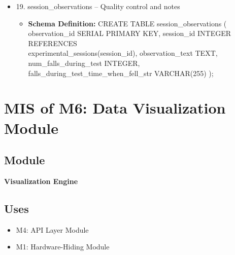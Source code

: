\documentclass[12pt, titlepage]{article}
\begin{document}
\begin{itemize}
\begin{itemize}
	\item{\textbf{Schema Definition: }CREATE TABLE session\_data\_files (
	      data\_file\_id SERIAL PRIMARY KEY,
	      session\_id INTEGER REFERENCES experimental\_sessions(session\_id),
	      movie\_file\_id INTEGER REFERENCES movie\_files(movie\_file\_id),
	      start\_frame INTEGER,
	      object\_type\_id INTEGER REFERENCES lkp\_data\_file\_object\_type(object\_type\_id),
	      file\_extension VARCHAR(10),
	      file\_name VARCHAR(255),
	      file\_size\_mb DOUBLE PRECISION,
	      notes\_session\_data\_files TEXT
	      );
	      }
	\item{\textbf{Referenced By: }data\_file\_locations \textbf{Foreign Key: }..data\_file\_id (One-to-Many. Each file record has multiple location records (local, FRDR v1, FRDR v2, backups))}
\end{itemize}
\item 19. session\_observations – Quality control and notes

\begin{itemize}
	\item{\textbf{Schema Definition: }CREATE TABLE session\_observations (
	      observation\_id SERIAL PRIMARY KEY,
	      session\_id INTEGER REFERENCES \\ experimental\_sessions(session\_id),
	      observation\_text TEXT,
	      num\_falls\_during\_test INTEGER,
	      falls\_during\_test\_time\_when\_fell\_str VARCHAR(255)
	      );
	      }
\end{itemize}

\end{itemize}

\newpage

\section{MIS of M6: Data Visualization Module} \label{Module 6} 

\subsection{Module}

\textbf{Visualization Engine}


\subsection{Uses}

\begin{itemize}
    \item M4: API Layer Module
    \item M1: Hardware-Hiding Module
\end{itemize}
\end{document}
